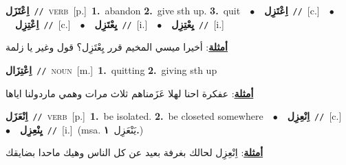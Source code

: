 \documentclass[10pt,a4paper,twoside]{article} %
\begin{document}
\begin{multicols}{2}
{\setlength\topsep{0pt}\textbf{\foreignlanguage{arabic}{اِعْتَزَل}}\ {\color{gray}\texttt{//}\color{black}}\ \textsc{verb}\ [p.]\ \textbf{1.}~abandon  \textbf{2.}~give sth up.  \textbf{3.}~quit\ \ $\bullet$\ \ \setlength\topsep{0pt}\textbf{\foreignlanguage{arabic}{اِعْتَزِل}}\ {\color{gray}\texttt{//}\color{black}}\ [c.]\ \ $\bullet$\ \ \setlength\topsep{0pt}\textbf{\foreignlanguage{arabic}{اِعْتِزِل}}\ {\color{gray}\texttt{//}\color{black}}\ [c.]\ \ $\bullet$\ \ \setlength\topsep{0pt}\textbf{\foreignlanguage{arabic}{يِعْتَزِل}}\ {\color{gray}\texttt{//}\color{black}}\ [i.]\ \ $\bullet$\ \ \setlength\topsep{0pt}\textbf{\foreignlanguage{arabic}{يِعْتِزِل}}\ {\color{gray}\texttt{//}\color{black}}\ [i.]\  \begin{flushright}\color{gray}\foreignlanguage{arabic}{\textbf{\underline{\foreignlanguage{arabic}{أمثلة}}}: أخيرا ميسي المخيم قرر يِعْتَزِل؟ قول وغير يا زلمة}\end{flushright}\color{black}} \vspace{2mm}

{\setlength\topsep{0pt}\textbf{\foreignlanguage{arabic}{اِعْتِزَال}}\ {\color{gray}\texttt{//}\color{black}}\ \textsc{noun}\ [m.]\ \textbf{1.}~quitting  \textbf{2.}~giving sth up\  \begin{flushright}\color{gray}\foreignlanguage{arabic}{\textbf{\underline{\foreignlanguage{arabic}{أمثلة}}}: عفكرة احنا لهلا عَزَمناهم ثلاث مرات وهمي ماردولنا اياها}\end{flushright}\color{black}} \vspace{2mm}

{\setlength\topsep{0pt}\textbf{\foreignlanguage{arabic}{اِنْعَزَل}}\ {\color{gray}\texttt{//}\color{black}}\ \textsc{verb}\ [p.]\ \textbf{1.}~be isolated.  \textbf{2.}~be closeted somewhere\ \ $\bullet$\ \ \setlength\topsep{0pt}\textbf{\foreignlanguage{arabic}{اِنْعِزِل}}\ {\color{gray}\texttt{//}\color{black}}\ [c.]\ \ $\bullet$\ \ \setlength\topsep{0pt}\textbf{\foreignlanguage{arabic}{يِنْعِزِل}}\ {\color{gray}\texttt{//}\color{black}}\ [i.]\ \color{gray}(msa. \foreignlanguage{arabic}{يَنْعَزِل}~\foreignlanguage{arabic}{\textbf{١.}})\color{black}\  \begin{flushright}\color{gray}\foreignlanguage{arabic}{\textbf{\underline{\foreignlanguage{arabic}{أمثلة}}}: اِنْعِزِل لحالك بغرفة بعيد عن كل الناس وهيك ماحدا بضايقك}\end{flushright}\color{black}} \vspace{2mm}


\end{multicols}
\end{document}
